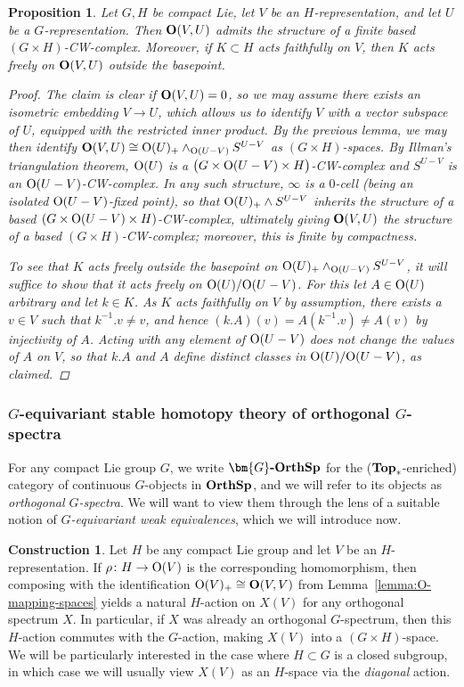 \documentclass[reqno]{memo-l}
\theoremstyle{mythm}
\newtheorem{prop}[thm]{Proposition}
\theoremstyle{definition}
\newtheorem{constr}[thm]{Construction}
\numberwithin{equation}{section}
\newcommand{\cat}[1]{\textbf{\textup{#1}}}
\renewcommand{\O}{{\textup{O}}}
\let\smashp=\wedge
\newcommand{\osp}{{\textbf{\textup{OrthSp}}}}
\newcommand{\Gosp}[1]{\cat{$\bm{#1}$-OrthSp}}
\begin{document}
\begin{prop}\label{prop:O-mapping-CW}
    Let $G,H$ be compact Lie, let $V$ be an $H$-representation, and let $U$ be a $G$-representation. Then $\cat{O}(V,U)$ admits the structure of a finite based $(G\times H)$-CW-complex. Moreover, if $K\subset H$ acts faithfully on $V$, then $K$ acts freely on $\cat{O}(V,U)$ outside the basepoint.
    \begin{proof}
        The claim is clear if $\cat{O}(V,U)=0$, so we may assume there exists an isometric embedding $V\to U$, which allows us to identify $V$ with a vector subspace of $U$, equipped with the restricted inner product. By the previous lemma, we may then identify $\cat{O}(V,U)\cong \O(U)_+\smashp_{\O(U-V)}S^{U-V}$ as $(G\times H)$-spaces. By Illman's triangulation theorem, $\O(U)$ is a $\big(G\times \O(U-V)\times H\big)$-CW-complex and $S^{U-V}$ is an $\O(U-V)$-CW-complex. In any such structure, $\infty$ is a $0$-cell (being an isolated $\O(U-V)$-fixed point), so that $\O(U)_+\smashp S^{U-V}$ inherits the structure of a based $(G\times \O(U-V)\times H)$-CW-complex, ultimately giving $\cat{O}(V,U)$ the structure of a based $(G\times H)$-CW-complex; moreover, this is finite by compactness.
    
        To see that $K$ acts freely outside the basepoint on $\O(U)_+\smashp_{\O(U-V)} S^{U-V}$, it will suffice to show that it acts freely on $\O(U)/{\O(U-V)}$. For this let $A\in \O(U)$ arbitrary and let $k\in K$. As $K$ acts faithfully on $V$ by assumption, there exists a $v\in V$ such that $k^{-1}.v\not=v$, and hence $(k.A)(v)=A(k^{-1}.v)\not=A(v)$ by injectivity of $A$. Acting with any element of $\O(U-V)$ does not change the values of $A$ on $V$, so that $k.A$ and $A$ define distinct classes in $\O(U)/{\O(U-V)}$, as claimed.
    \end{proof}
\end{prop}

\subsubsection{$G$-equivariant stable homotopy theory of orthogonal $G$-spectra} For any compact Lie group $G$, we write $\Gosp{G}$ for the ($\cat{Top}_*$-enriched) category of continuous $G$-objects in $\osp$, and we will refer to its objects as \emph{orthogonal $G$-spectra}. We will want to view them through the lens of a suitable notion of \emph{$G$-equivariant weak equivalences}, which we will introduce now.

\begin{constr}
    Let $H$ be any compact Lie group and let $V$ be an $H$-representation. If $\rho\colon H\to \O(V)$ is the corresponding homomorphism, then composing with the identification $\O(V)_+\cong\cat{O}(V,V)$ from Lemma~\ref{lemma:O-mapping-spaces} yields a natural $H$-action on $X(V)$ for any orthogonal spectrum $X$. In particular, if $X$ was already an orthogonal $G$-spectrum, then this $H$-action commutes with the $G$-action, making $X(V)$ into a $(G\times H)$-space. We will be particularly interested in the case where $H\subset G$ is a closed subgroup, in which case we will usually view $X(V)$ as an $H$-space via the \emph{diagonal} action.
\end{constr}
\end{document}
